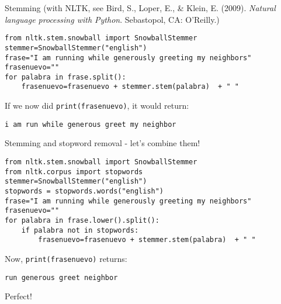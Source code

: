 \documentclass{beamer}
\begin{document}
\begin{frame}[fragile]{Stemming}
{\footnotesize{(with NLTK, see Bird, S., Loper, E., \& Klein, E. (2009). \emph{Natural language processing with Python}. Sebastopol, CA: O’Reilly.)}}
\begin{lstlisting}
from nltk.stem.snowball import SnowballStemmer
stemmer=SnowballStemmer("english")
frase="I am running while generously greeting my neighbors"
frasenuevo=""
for palabra in frase.split():
    frasenuevo=frasenuevo + stemmer.stem(palabra)  + " "
\end{lstlisting}
If we now did {\tt{print(frasenuevo)}}, it would return:
\begin{lstlisting}
i am run while generous greet my neighbor
\end{lstlisting}
\end{frame}

\begin{frame}[fragile]{Stemming and stopword removal - let's combine them!}
\begin{lstlisting}
from nltk.stem.snowball import SnowballStemmer
from nltk.corpus import stopwords
stemmer=SnowballStemmer("english")
stopwords = stopwords.words("english")
frase="I am running while generously greeting my neighbors"
frasenuevo=""
for palabra in frase.lower().split():
    if palabra not in stopwords:
        frasenuevo=frasenuevo + stemmer.stem(palabra)  + " "
\end{lstlisting}
Now, {\tt{print(frasenuevo)}} returns:
\begin{lstlisting}
run generous greet neighbor
\end{lstlisting}
Perfect!\\
\end{frame}

{
\begin{frame}[plain]
\end{frame}
}
\end{document}
